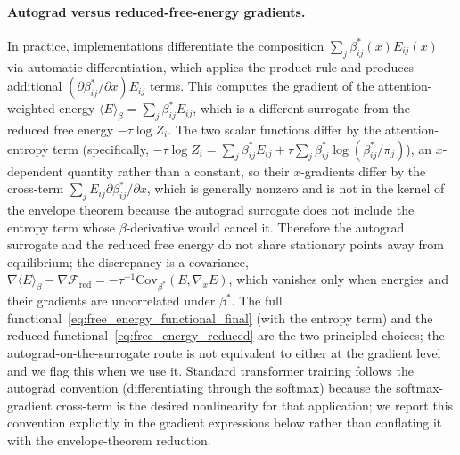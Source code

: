 \documentclass[11pt]{article}
\begin{document}
\paragraph{Autograd versus reduced-free-energy gradients.}
In practice, implementations differentiate the composition $\sum_j \beta_{ij}^*(x)E_{ij}(x)$ via automatic differentiation, which applies the product rule and produces additional $(\partial\beta_{ij}^*/\partial x)E_{ij}$ terms. This computes the gradient of the attention-weighted energy $\langle E \rangle_\beta = \sum_j \beta_{ij}^* E_{ij}$, which is a different surrogate from the reduced free energy $-\tau\log Z_i$. The two scalar functions differ by the attention-entropy term (specifically, $-\tau \log Z_i = \sum_j\beta^*_{ij}E_{ij} + \tau\sum_j\beta^*_{ij}\log(\beta^*_{ij}/\pi_j)$), an $x$-dependent quantity rather than a constant, so their $x$-gradients differ by the cross-term $\sum_j E_{ij} \partial\beta^*_{ij}/\partial x$, which is generally nonzero and is not in the kernel of the envelope theorem because the autograd surrogate does not include the entropy term whose $\beta$-derivative would cancel it. Therefore the autograd surrogate and the reduced free energy do not share stationary points away from equilibrium; the discrepancy is a covariance, $\nabla\langle E\rangle_\beta - \nabla\mathcal{F}_{\mathrm{red}} = -\tau^{-1}\mathrm{Cov}_{\beta^*}(E, \nabla_x E)$, which vanishes only when energies and their gradients are uncorrelated under $\beta^*$. The full functional~\eqref{eq:free_energy_functional_final} (with the entropy term) and the reduced functional~\eqref{eq:free_energy_reduced} are the two principled choices; the autograd-on-the-surrogate route is not equivalent to either at the gradient level and we flag this when we use it. Standard transformer training follows the autograd convention (differentiating through the softmax) because the softmax-gradient cross-term is the desired nonlinearity for that application; we report this convention explicitly in the gradient expressions below rather than conflating it with the envelope-theorem reduction.
\end{document}
